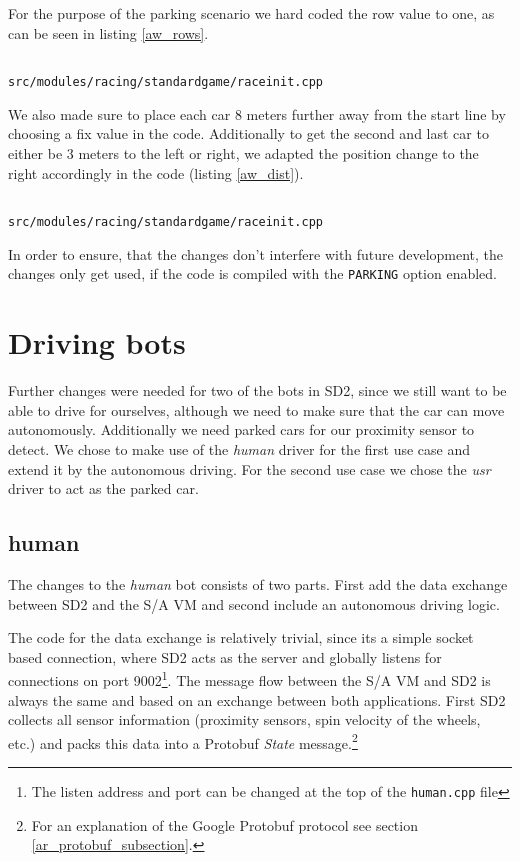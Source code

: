 \documentclass[paper=a4, fontsize=11pt]{scrreprt}
\begin{document}
For the purpose of the parking scenario we hard coded the row value to one,
as can be seen in listing \ref{aw_rows}.
\begin{listing}[ht]
  \inputminted[firstline=309,linenos=true,lastline=311,gobble=1]{c++}{../../../simulators/speed-dreams/src/modules/racing/standardgame/raceinit.cpp}
  \caption{\texttt{src/modules/racing/standardgame/raceinit.cpp}}\label{aw_rows}
\end{listing}

We also made sure to place each car 8 meters further away from the start line by choosing a fix value in the code.
Additionally to get the second and last car to either be 3 meters to the left or right,
we adapted the position change to the right accordingly in the code (listing \ref{aw_dist}).
\begin{listing}[ht]
  \inputminted[firstline=316,linenos=true,lastline=327,gobble=4]{c++}{../../../simulators/speed-dreams/src/modules/racing/standardgame/raceinit.cpp}
  \caption{\texttt{src/modules/racing/standardgame/raceinit.cpp}}\label{aw_dist}
\end{listing}

In order to ensure, that the changes don't interfere with future development,
the changes only get used, if the code is compiled with the \texttt{PARKING} option enabled.

\section{Driving bots}
Further changes were needed for two of the bots in SD2,
since we still want to be able to drive for ourselves,
although we need to make sure that the car can move autonomously.
Additionally we need parked cars for our proximity sensor to detect.
We chose to make use of the \textit{human} driver for the first use case
and extend it by the autonomous driving.
For the second use case we chose the \textit{usr} driver to act as the parked car.

\subsection{human}
The changes to the \textit{human} bot consists of two parts.
First add the data exchange between SD2 and the S/A VM
and second include an autonomous driving logic.

The code for the data exchange is relatively trivial,
since its a simple socket based connection,
where SD2 acts as the server and globally listens for connections on port 9002\footnote{The listen address and port can be changed at the top of the \texttt{human.cpp} file}.
The message flow between the S/A VM and SD2 is always the same
and based on an exchange between both applications.
First SD2 collects all sensor information (proximity sensors, spin velocity of the wheels, etc.)
and packs this data into a Protobuf \textit{State} message.\footnote{For an explanation of the Google Protobuf protocol see section \ref{ar_protobuf_subsection}.}
\end{document}
